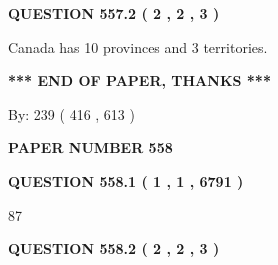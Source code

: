 \documentclass[12pt]{article}
\begin{document}
 
  
\vspace{0.2in}
  
{\textbf{\Large{QUESTION
557.2 
 ( 2 , 2 , 3 )
}}}
  
  
 
 
\noindent{}
 
 
Canada has 10  provinces and 3 territories.
 
 
 
 
   
   
 \vspace{0.2in}
 
   
   
   
   
\vspace{1.0in} 
{\textbf{\large{ *** END OF PAPER, THANKS *** }}} 
   
   
\hspace{1.0in} By: 
 239 ( 416 ,  613 )
   
   
   
   
\newpage 
\setcounter{page}{ 
   558001 } 
   
   
   
   
 {\textbf{ \Large{ PAPER NUMBER  558  }}}
   
   
\vspace{0.2in}
   
   
   
   
   
   
 \vspace{0.2in}
 
 
 
 
   
   
  
\vspace{0.2in}
  
{\textbf{\Large{QUESTION
558.1 
 ( 1 , 1 , 6791 )
}}}
  
  
 
 
\noindent{}

87
 
 
  
\vspace{0.2in}
  
{\textbf{\Large{QUESTION
558.2 
 ( 2 , 2 , 3 )
}}}
  
\end{document}
